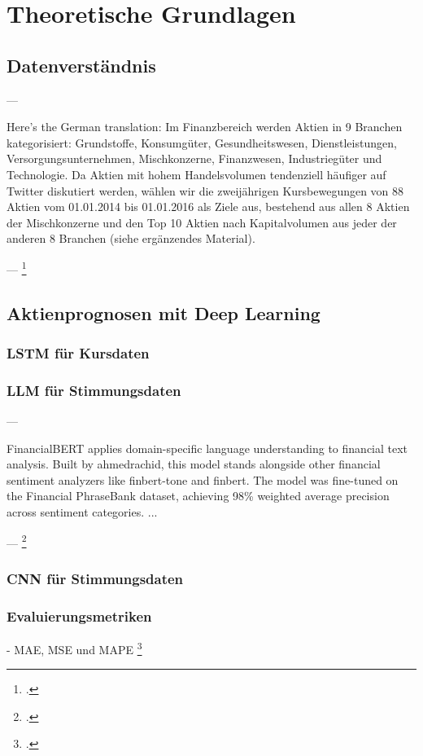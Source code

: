 \newpage
\section{Theoretische Grundlagen}\label{sec:theorie}



\subsection{Datenverständnis}\label{sec:theorie_data_understanding}

---

Here's the German translation:
Im Finanzbereich werden Aktien in 9 Branchen kategorisiert: Grundstoffe, Konsumgüter, Gesundheitswesen, Dienstleistungen, Versorgungsunternehmen, Mischkonzerne, Finanzwesen, Industriegüter und Technologie. Da Aktien mit hohem Handelsvolumen tendenziell häufiger auf Twitter diskutiert werden, wählen wir die zweijährigen Kursbewegungen von 88 Aktien vom 01.01.2014 bis 01.01.2016 als Ziele aus, bestehend aus allen 8 Aktien der Mischkonzerne und den Top 10 Aktien nach Kapitalvolumen aus jeder der anderen 8 Branchen (siehe ergänzendes Material).

---
\footcite[Kap. 3]{xu2018StockMovement}


\subsection{Aktienprognosen mit Deep Learning}\label{sec:theorie_dl}

\subsubsection{LSTM für Kursdaten}\label{sec:theorie_lstm}

\subsubsection{LLM für Stimmungsdaten}\label{sec:theorie_llm}
---

FinancialBERT applies domain-specific language understanding to financial text analysis. Built by ahmedrachid, this model stands alongside other financial sentiment analyzers like finbert-tone and finbert. The model was fine-tuned on the Financial PhraseBank dataset, achieving 98\% weighted average precision across sentiment categories.
...

---
\footcite{hazourli2022financialbert}


\subsubsection{CNN für Stimmungsdaten}\label{sec:theorie_cnn}

\subsubsection{Evaluierungsmetriken}\label{sec:theorie_evalmetrics}

- \ac{MAE}, \ac{MSE} und \ac{MAPE}  
\footcite[Kap. 4.3]{xie2024deep}









